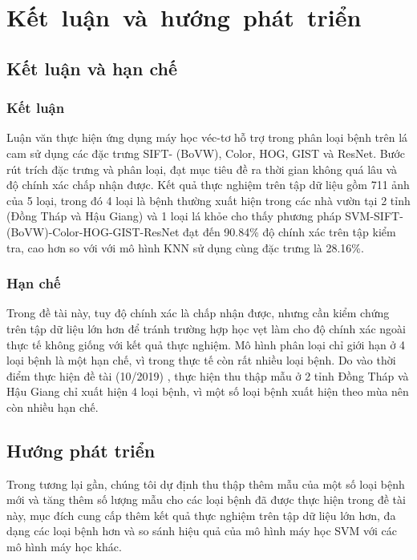 \chapter{\mbox{Kết luận và hướng phát triển}} \label{chapter05}

\section{Kết luận và hạn chế}
\subsection{Kết luận}
Luận văn thực hiện ứng dụng máy học véc-tơ hỗ trợ trong phân loại bệnh trên lá cam sử dụng các đặc trưng SIFT- (BoVW), Color, HOG, GIST và ResNet. Bước rút trích đặc trưng và phân loại, đạt mục tiêu đề ra thời gian không quá lâu và độ chính xác chấp nhận được. Kết quả thực nghiệm trên tập dữ liệu gồm 711 ảnh của 5 loại, trong đó 4 loại là bệnh thường xuất hiện trong các nhà vườn tại 2 tỉnh (Đồng Tháp và Hậu Giang) và 1 loại lá khỏe cho thấy phương pháp SVM-SIFT-(BoVW)-Color-HOG-GIST-ResNet đạt đến 90.84\% độ chính xác trên tập kiểm tra, cao hơn so với với mô hình KNN sử dụng cùng đặc trưng là 28.16\%.

\subsection{Hạn chế}
Trong đề tài này, tuy độ chính xác là chấp nhận được, nhưng cần kiểm chứng trên tập dữ liệu lớn hơn để tránh trường hợp học vẹt làm cho độ chính xác ngoài thực tế không giống với kết quả thực nghiệm. Mô hình phân loại chỉ giới hạn ở 4 loại bệnh là một hạn chế, vì trong thực tế còn rất nhiều loại bệnh. Do vào thời điểm thực hiện đề tài (10/2019) , thực hiện thu thập mẫu ở 2 tỉnh Đồng Tháp và Hậu Giang chỉ xuất hiện 4 loại bệnh, vì một số loại bệnh xuất hiện theo mùa nên còn nhiều hạn chế.


\section{Hướng phát triển}
Trong tương lại gần, chúng tôi dự định thu thập thêm mẫu của một số loại bệnh mới và tăng thêm số lượng mẫu cho các loại bệnh đã được thực hiện trong đề tài này, mục đích cung cấp thêm kết quả thực nghiệm trên tập dữ liệu lớn hơn, đa dạng các loại bệnh hơn và so sánh hiệu quả của mô hình máy học SVM với các mô hình máy học khác.